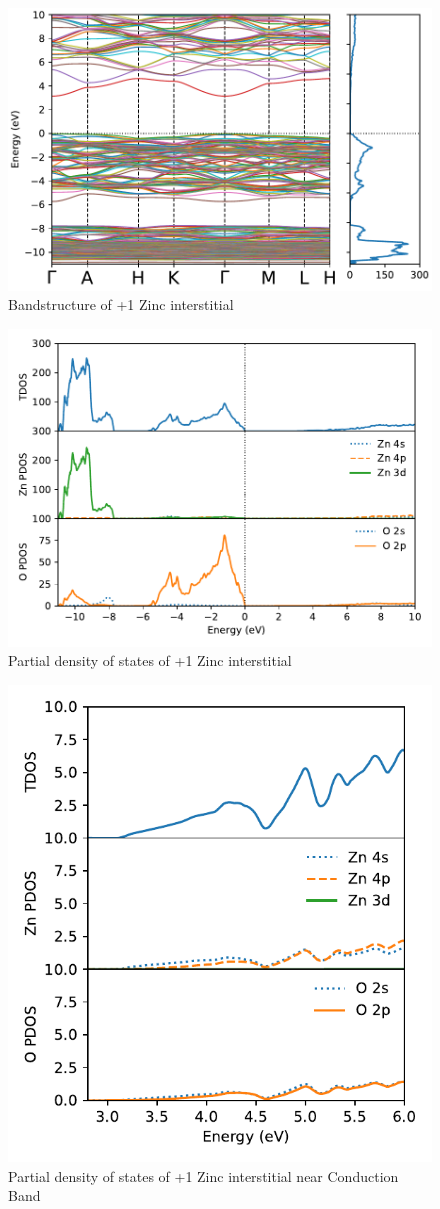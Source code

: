\begin{figure}[tbh!]
	\centering
	\includegraphics[width=0.7\linewidth]{"images/rnd/band-dos_Zn_i-p1"}
	\caption[Bandstructure of +1 Zinc interstitial]{Bandstructure of +1 Zinc interstitial}
\end{figure}

\begin{figure}[tbh!]
	\centering
	\includegraphics[width=0.7\linewidth]{"images/rnd/dos-pdos_Zn_i-p1"}
	\caption[Partial density of states of +1 Zinc interstitial]{Partial density of states of +1 Zinc interstitial }
\end{figure}

\begin{figure}[tbh!]
	\centering
	\includegraphics[width=0.5\linewidth]{"images/rnd/dos-pdos-zoom_Zn_i-p1"}
	\caption[Partial density of states of +1 Zinc interstitial near Conduction Band]{Partial density of states of +1 Zinc interstitial near Conduction Band}
\end{figure}

